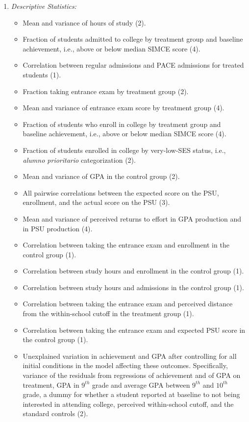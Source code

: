 \begin{enumerate}[leftmargin=5.5mm]
    \item {\itshape Descriptive Statistics:}
    \begin{itemize}[leftmargin=3.5mm]\setlength\itemsep{0.0em}
        \item Mean and variance of hours of study (2).
        \item Fraction of students admitted to college by treatment group and baseline achievement, i.e., above or below median SIMCE score (4).
        \item Correlation between regular admissions and PACE admissions for treated students (1).
        \item Fraction taking entrance exam by treatment group (2).
        \item Mean and variance of entrance exam score by treatment group (4).
        \item Fraction of students who enroll in college by treatment group and baseline achievement, i.e., above or below median SIMCE score (4).
        \item Fraction of students enrolled in college by very-low-SES status, i.e., {\itshape alumno prioritario} categorization (2).
        \item Mean and variance of GPA in the control group (2).
        \item All pairwise correlations between the expected score on the PSU, enrollment, and the actual score on the PSU (3).
        \item Mean and variance of perceived returns to effort in GPA production and in PSU production (4).
        \item Correlation between taking the entrance exam and enrollment in the control group (1).
        \item Correlation between study hours and enrollment in the control group (1).
        \item Correlation between study hours and admissions in the control group (1).
        \item Correlation between taking the entrance exam and perceived distance from the within-school cutoff in the treatment group (1).
        \item Correlation between taking the entrance exam and expected PSU score in the control group (1).
        \item Unexplained variation in achievement and GPA after controlling for all initial conditions in the model affecting these outcomes. Specifically, variance of the residuals from regressions of achievement and of GPA on treatment, GPA in $9^{th}$ grade and average GPA between $9^{th}$ and $10^{th}$ grade, a dummy for whether a student reported at baseline to not being interested in attending college, perceived within-school cutoff, and the standard controls (2).

\end{itemize}
\end{enumerate}
